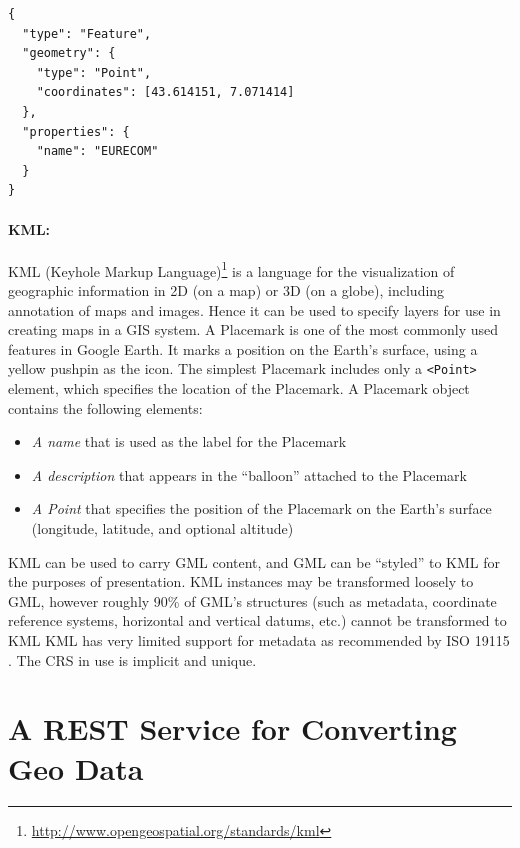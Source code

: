 \begin{verbatim}
{
  "type": "Feature",
  "geometry": {
    "type": "Point",
    "coordinates": [43.614151, 7.071414]
  },
  "properties": {
    "name": "EURECOM"
  }
}
\end{verbatim}

 
 \paragraph{KML:}
KML (Keyhole Markup Language)\footnote{\url{http://www.opengeospatial.org/standards/kml}} is a language for the visualization of geographic information in 2D (on a map) or 3D (on a globe), including annotation of maps and images. Hence it can be used to specify layers for use in creating maps in a GIS system.  A Placemark is one of the most commonly used features in Google Earth. It marks a position on the Earth's surface, using a yellow pushpin as the icon. The simplest Placemark includes only a \texttt{<Point>} element, which specifies the location of the Placemark.
A Placemark object contains the following elements:
\begin{itemize}
\item \textit{A name} that is used as the label for the Placemark
\item \textit{A description} that appears in the ``balloon'' attached to the Placemark
\item \textit{A Point} that specifies the position of the Placemark on the Earth's surface (longitude, latitude, and optional altitude)
\end{itemize}

KML can be used to carry GML content, and GML can be ``styled'' to KML for the purposes of presentation. KML instances may be transformed loosely to GML, however roughly 90\% of GML's structures (such as metadata, coordinate reference systems, horizontal and vertical datums, etc.) cannot be transformed to KML%
KML has very limited support for metadata as recommended by ISO 19115 \cite{iso19115}. The CRS in use is implicit and unique.

\section{A REST Service for Converting Geo Data}
\label{sec:rest-service}

